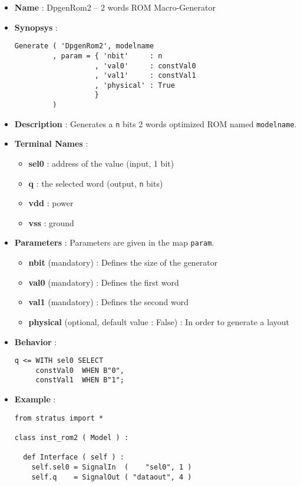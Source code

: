 \begin{itemize}
    \item \textbf{Name} : DpgenRom2 -- 2 words ROM Macro-Generator
    \item \textbf{Synopsys} :
\begin{verbatim}
Generate ( 'DpgenRom2', modelname
         , param = { 'nbit'     : n
                   , 'val0'     : constVal0
                   , 'val1'     : constVal1
                   , 'physical' : True                   
                   }
         )
\end{verbatim}
    \item \textbf{Description} : Generates a \verb-n- bits 2 words optimized ROM named \verb-modelname-.
    \item \textbf{Terminal Names} :
    \begin{itemize}
        \item \textbf{sel0} : address of the value (input, 1 bit)
        \item \textbf{q} : the selected word (output, \verb-n- bits)
        \item \textbf{vdd} : power
        \item \textbf{vss} : ground
    \end{itemize}
    \item \textbf{Parameters} : Parameters are given in the map \verb-param-.
    \begin{itemize}
        \item \textbf{nbit} (mandatory) : Defines the size of the generator
        \item \textbf{val0} (mandatory) : Defines the first word
        \item \textbf{val1} (mandatory) : Defines the second word
        \item \textbf{physical} (optional, default value : False) : In order to generate a layout        
    \end{itemize}
    \item \textbf{Behavior} :
\begin{verbatim}
q <= WITH sel0 SELECT
     constVal0  WHEN B"0",
     constVal1  WHEN B"1";
\end{verbatim}
    \item \textbf{Example} :
\begin{verbatim}
from stratus import *

class inst_rom2 ( Model ) :

  def Interface ( self ) :
    self.sel0 = SignalIn  (    "sel0", 1 )
    self.q    = SignalOut ( "dataout", 4 )
    

\end{verbatim}
\end{itemize}
